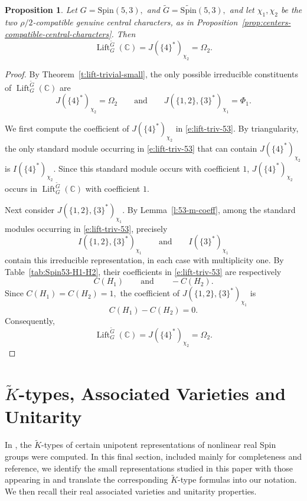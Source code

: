 \documentclass{amsart}
\DeclareMathOperator{\Lift}{Lift}
\newcommand{\LiftC}{\Lift_G^{\tu G}(\bbC)}
\newcommand{\bbC}{{\mathbb{C}}}
\newcommand{\Spin}{{\mathrm{Spin}}}
\newtheorem{prop}[thm]{Proposition}
\theoremstyle{definition}
\newcommand{\tu}{\widetilde}
\begin{document}
\begin{prop}\label{p:lift-triv-53}
Let
$G=\Spin(5,3),$ and 
$\tu G=\tu{\Spin}(5,3),$
and let \(\chi_1,\chi_2\) be the two \(\rho/2\)-compatible genuine central characters, as in
Proposition~\ref{prop:centers-compatible-central-characters}.
Then
\[
\LiftC
=
J(\{4\}^*)_{\chi_2}
=
\Omega_2.
\]
\end{prop}
\begin{proof}
By Theorem~\ref{t:lift-trivial-small}, the only possible irreducible
constituents of \(\LiftC\) are
\[
J(\{4\}^*)_{\chi_2}=\Omega_2
\qquad\text{and}\qquad
J(\{1,2\},\{3\}^*)_{\chi_1}=\Phi_1.
\]

We first compute the coefficient of
\(J(\{4\}^*)_{\chi_2}\) in \eqref{e:lift-triv-53}.
By triangularity, the only standard module occurring in
\eqref{e:lift-triv-53} that can contain
\(J(\{4\}^*)_{\chi_2}\) is $I(\{4\}^*)_{\chi_2}.$
Since this standard module occurs with coefficient \(1\),
\(J(\{4\}^*)_{\chi_2}\) occurs in \(\LiftC\) with coefficient \(1\).

Next consider
$J(\{1,2\},\{3\}^*)_{\chi_1}.$
By Lemma~\ref{l:53-m-coeff}, among the standard modules occurring in
\eqref{e:lift-triv-53}, precisely
\[
I(\{1,2\},\{3\}^*)_{\chi_1}
\qquad\text{and}\qquad
I(\{3\}^*)_{\chi_1}
\]
contain this irreducible representation, in each case with
multiplicity one. By Table~\ref{tab:Spin53-H1-H2}, their coefficients
in \eqref{e:lift-triv-53} are respectively
\[
C(H_1)
\qquad\text{and}\qquad
-C(H_2).
\]
Since
$C(H_1)=C(H_2)=1,$
the coefficient of \(J(\{1,2\},\{3\}^*)_{\chi_1}\) is
\[
C(H_1)-C(H_2)=0.
\]
Consequently,
\[
\LiftC
=
J(\{4\}^*)_{\chi_2}
=
\Omega_2.
\]
\end{proof}



\section{$\tu K$-types, Associated Varieties and Unitarity}

In \cite{BTs18}, the $\tu K$-types of certain unipotent representations
of nonlinear real Spin groups were computed.  In this final section,
included mainly for completeness and reference, we identify the small
representations studied in this paper with those appearing in
\cite{BTs18} and translate the corresponding $\tu K$-type formulas
into our notation.  We then recall their real associated varieties
and unitarity properties.
 
\end{document}
